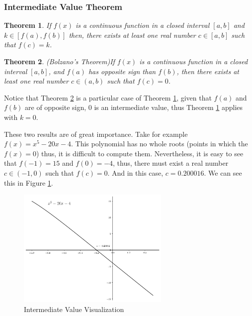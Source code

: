 \documentclass[a4paper,11pt]{article}
\theoremstyle{definition}
\theoremstyle{plain}
\newtheorem{theorem}{Theorem}
\begin{document}
\subsubsection{Intermediate Value
Theorem}\label{intermediate-value-theorem}

\begin{theorem}\label{interm_val_thm}
If \(f(x)\) is a continuous function in a closed
interval \([a,b]\) and \(k\in[f(a),f(b)]\) then, there exists at least
one real number \(c\in[a,b]\) such that \(f(c) = k\).
\end{theorem}

\begin{theorem}{(Bolzano's Theorem)}\label{bolzano_thm}
If \(f(x)\) is a continuous
function in a closed interval \([a, b]\), and \(f(a)\) has opposite sign
than \(f(b)\), then there exists at least one real number \(c\in(a, b)\)
such that \(f(c) = 0\).
\end{theorem}

Notice that Theorem \ref{bolzano_thm} is a particular case of Theorem \ref{interm_val_thm}, given that
\(f(a)\) and \(f(b)\) are of opposite sign, \(0\) is an intermediate
value, thus Theorem \ref{interm_val_thm} applies with \(k = 0\).

These two results are of great importance. Take for example
\(f(x) = x^5-20x-4\). This polynomial has no whole roots (points in
which the \(f(x) = 0\)) thus, it is difficult to compute them.
Nevertheless, it is easy to see that \(f(-1) = 15\) and \(f(0) = -4\),
thus, there must exist a real number \(c\in(-1,0)\) such that
\(f(c) = 0\). And in this case, \(c = 0.200016\). We can see this in Figure \ref{fig:interm_value_thm}.

    \begin{figure}[htbp]
    	\centering 
    		\includegraphics[width = 0.65\textwidth]{Ch1_files/Ch1_29_0.png}
    		\caption{Intermediate Value Visualization}
    		\label{fig:interm_value_thm}
    \end{figure}
    
\end{document}
